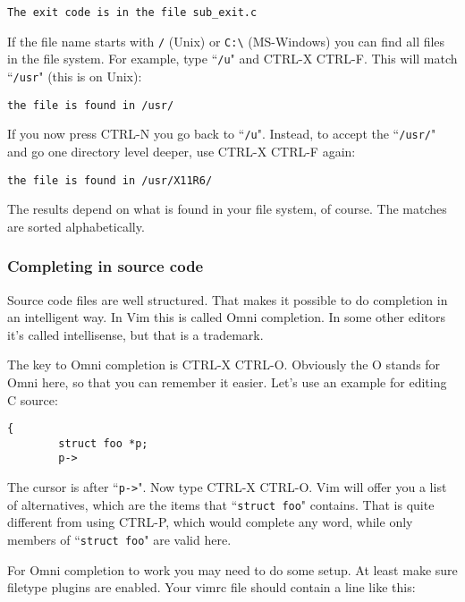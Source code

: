 \begin{Verbatim}[samepage=true]
    The exit code is in the file sub_exit.c 
\end{Verbatim}

If the file name starts with \texttt{/} (Unix) or \texttt{C:\textbackslash{}} (MS-Windows) you can find all files in the file system.
For example, type ``\texttt{/u}" and CTRL-X CTRL-F.
This will match ``\texttt{/usr}" (this is on Unix):

\begin{Verbatim}[samepage=true]
    the file is found in /usr/ 
\end{Verbatim}

If you now press CTRL-N you go back to ``\texttt{/u}".
Instead, to accept the ``\texttt{/usr/}" and go one directory level deeper, use CTRL-X CTRL-F again:

\begin{Verbatim}[samepage=true]
    the file is found in /usr/X11R6/ 
\end{Verbatim}

The results depend on what is found in your file system, of course.
The matches are sorted alphabetically.
\subsubsection{Completing in source code}
Source code files are well structured.
That makes it possible to do completion in an intelligent way.
In Vim this is called Omni completion.
In some other editors it's called intellisense, but that is a trademark.

The key to Omni completion is CTRL-X CTRL-O.
Obviously the O stands for Omni here, so that you can remember it easier.
Let's use an example for editing C source:

\begin{Verbatim}[samepage=true]
    { 
        struct foo *p; 
        p-> 
\end{Verbatim}

The cursor is after ``\texttt{p->}".
Now type CTRL-X CTRL-O.
Vim will offer you a list of alternatives, which are the items that ``\texttt{struct foo}" contains.
That is quite different from using CTRL-P, which would complete any word, while only members of ``\texttt{struct foo}" are valid here.

For Omni completion to work you may need to do some setup.
At least make sure filetype plugins are enabled.
Your vimrc file should contain a line like this:

